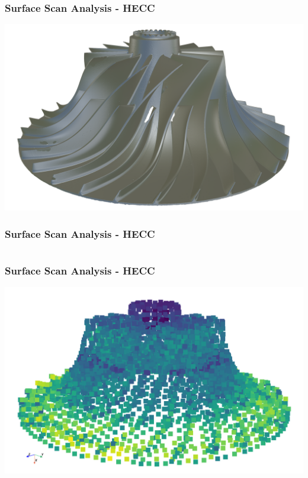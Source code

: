 \documentclass[t]{beamer}
\renewcommand{\footnotesize}{\scriptsize}
\begin{document}
\begin{frame}

    \frametitle{Surface Scan Analysis - HECC}

    \begin{center}

        \includegraphics[width=1.0\textwidth]{figures/hecc-rotor-pbr.png}

    \end{center}

\end{frame}

\begin{frame}

    \frametitle{Surface Scan Analysis - HECC}
    \inputminted[fontsize=\footnotesize]{python}{code/hecc-2.py}

\end{frame}

\begin{frame}

    \frametitle{Surface Scan Analysis - HECC}

    \begin{center}
        \includegraphics[width=1.0\textwidth]{figures/hecc-rotor-pfh-pointset.png}
    \end{center}

\end{frame}
\end{document}
